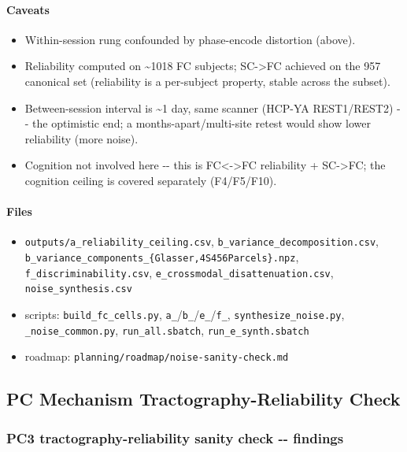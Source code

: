 \paragraph{Caveats}\label{caveats-1}

\begin{itemize}
\tightlist
\item
  Within-session rung confounded by phase-encode distortion (above).
\item
  Reliability computed on \textasciitilde1018 FC subjects; SC-\textgreater FC achieved on the 957 canonical set (reliability is a per-subject property, stable across the subset).
\item
  Between-session interval is \textasciitilde1 day, same scanner (HCP-YA REST1/REST2) -\/- the optimistic end; a months-apart/multi-site retest would show lower reliability (more noise).
\item
  Cognition not involved here -\/- this is FC\textless-\textgreater FC reliability + SC-\textgreater FC; the cognition ceiling is covered separately (F4/F5/F10).
\end{itemize}

\paragraph{Files}\label{files-1}

\begin{itemize}
\tightlist
\item
  \texttt{outputs/a\_reliability\_ceiling.csv}, \texttt{b\_variance\_decomposition.csv}, \texttt{b\_variance\_components\_\{Glasser,4S456Parcels\}.npz}, \texttt{f\_discriminability.csv}, \texttt{e\_crossmodal\_disattenuation.csv}, \texttt{noise\_synthesis.csv}
\item
  scripts: \texttt{build\_fc\_cells.py}, \texttt{a\_}/\texttt{b\_}/\texttt{e\_}/\texttt{f\_}, \texttt{synthesize\_noise.py}, \texttt{\_noise\_common.py}, \texttt{run\_all.sbatch}, \texttt{run\_e\_synth.sbatch}
\item
  roadmap: \texttt{planning/roadmap/noise-sanity-check.md}
\end{itemize}

\subsection{PC Mechanism Tractography-Reliability Check}\label{pc-mechanism-tractography-reliability-check}

\subsubsection{PC3 tractography-reliability sanity check -\/- findings}\label{pc3-tractography-reliability-sanity-check----findings}

